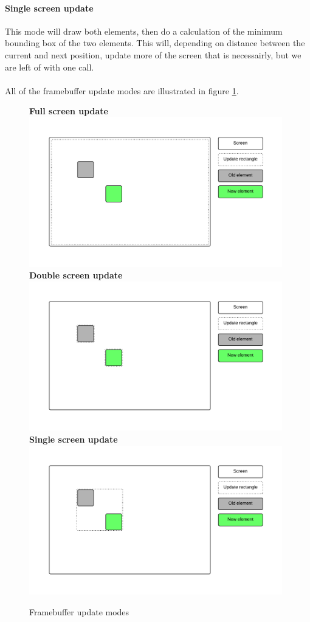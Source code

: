 \paragraph{Single screen update}
This mode will draw both elements, then do a calculation of the minimum bounding box of the two elements. This will, depending on distance between the current and next position, update more of the screen that is necessairly, but we are left of with one  call.\\
\\
All of the framebuffer update modes are illustrated in figure \ref{fig:framebuffer-update-modes}.
\\
\begin{figure}
	\label{fig:framebuffer-update-modes}
	\centering
	\textbf{Full screen update} \\
	\includegraphics[width=11cm]{img/update_entire_screen.png}\\
	\textbf{Double screen update} \\
	\includegraphics[width=11cm]{img/update_twice.png}\\
	\textbf{Single screen update} \\
	\includegraphics[width=11cm]{img/update_once.png}\\
	\caption{Framebuffer update modes}
\end{figure}
